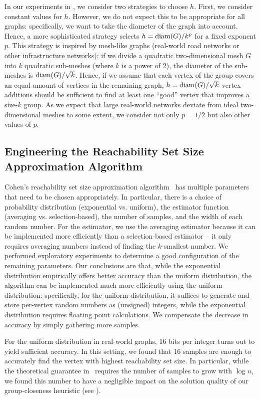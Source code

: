 In our experiments in , we consider two
strategies to choose $h$. First, we consider constant values for $h$. However,
we do not expect this to be appropriate for all graphs: specifically, we want
to take the diameter of the graph into account. Hence, a more sophisticated
strategy selects $h = \text{diam}(G) / k^p$ for a fixed exponent $p$.
%
This strategy is inspired by mesh-like graphs (\eg real-world road networks or
other infrastructure networks): if we divide a quadratic two-dimensional mesh
$G$ into $k$ quadratic sub-meshes (where $k$ is a power of 2), the diameter of
the sub-meshes is $\text{diam}(G) / \sqrt{k}$. Hence, if we assume that each vertex
of the group covers an equal amount of vertices in the remaining graph, $h =
\text{diam}(G) / \sqrt{k}$ vertex additions should be sufficient to find at least
one \enquote{good} vertex that improves a size-$k$ group.
%
As we expect that large real-world networks deviate from ideal two-dimensional
meshes to some extent, we consider not only $p = 1/2$ but also other values of
$p$.


\subsection{Engineering the Reachability Set Size Approximation Algorithm}
%
Cohen's reachability set size approximation
algorithm~\cite{DBLP:journals/jcss/Cohen97} has multiple parameters that need
to be chosen appropriately. In particular, there is a choice of probability
distribution (exponential vs. uniform), the estimator function (averaging vs.
selection-based), the number of samples, and the width of each random number.
%
For the estimator, we use the averaging estimator because it can be implemented
more efficiently than a selection-based estimator -- it only requires averaging
numbers instead of finding the $k$-smallest number.
%
We performed exploratory experiments to determine a good configuration of the
remaining parameters. Our conclusions are that, while the exponential
distribution empirically offers better accuracy than the uniform distribution,
the algorithm can be implemented much more efficiently using the uniform
distribution: specifically, for the uniform distribution, it suffices to
generate and store per-vertex random numbers as (unsigned) integers, while the
exponential distribution requires floating point calculations. We compensate
the decrease in accuracy by simply gathering more samples.

For the uniform distribution in real-world graphs, 16 bits per integer turns
out to yield sufficient accuracy. In this setting, we found that 16 samples
are enough to accurately find the vertex with highest reachability set size.
%
In particular, while the theoretical guarantee in~\cite{DBLP:journals/jcss/Cohen97}
requires the number of samples to grow with $\log n$, we found this number to
have a negligible impact on the solution quality of our group-closeness
heuristic (see ).

